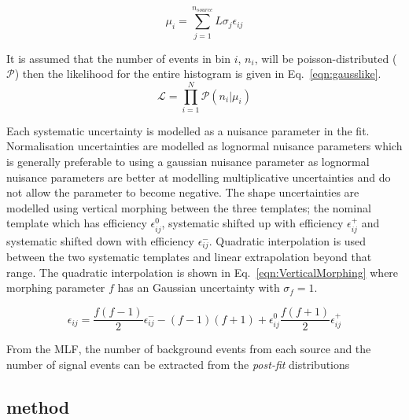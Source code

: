 \begin{equation}
\mu_{i} = \sum_{j=1}^{n_{source}}L\sigma_{j}\epsilon_{ij}
\label{eqn:expectedmui}
\end{equation}

It is assumed that the number of events in bin $i$, $n_{i}$, will be poisson-distributed ($\mathcal{P}$) then the likelihood for the entire histogram is given in Eq.~\ref{eqn:gausslike}.
\begin{equation}
\mathcal{L} = \prod_{i=1}^{N} \mathcal{P}\left(n_{i}|\mu_{i}\right)
\label{eqn:gausslike}
\end{equation}

Each systematic uncertainty is modelled as a nuisance parameter in the fit. Normalisation uncertainties are modelled as lognormal nuisance parameters which is generally preferable to using a gaussian nuisance parameter as lognormal nuisance parameters are better at modelling multiplicative uncertainties and do not allow the parameter to become negative. The shape uncertainties are modelled using vertical morphing between the three templates; the nominal template which has efficiency $\epsilon_{ij}^{0}$, systematic shifted up with efficiency $\epsilon_{ij}^{+}$ and systematic shifted down with efficiency $\epsilon_{ij}^{-}$. Quadratic interpolation is used between the two systematic templates and linear extrapolation beyond that range. The quadratic interpolation is shown in Eq.~\ref{eqn:VerticalMorphing} where morphing parameter $f$ has an Gaussian uncertainty with $\sigma_{f}=1$.

\begin{equation}
\epsilon_{ij} = \frac{f\left(f-1\right)}{2}\epsilon_{ij}^{-} - \left(f-1\right)\left(f+1\right) + \epsilon_{ij}^{0}  \frac{f\left(f+1\right)}{2}\epsilon_{ij}^{+}
\label{eqn:VerticalMorphing}
\end{equation}

From the MLF, the number of background events from each source and the number of signal events can be extracted from the \emph{post-fit} distributions

\subsection{\CLS method}


